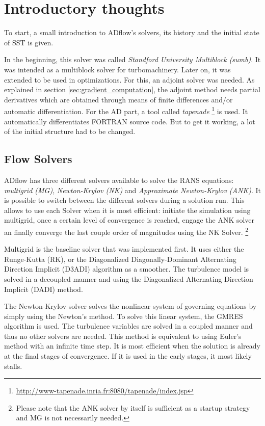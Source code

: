 \section{Introductory thoughts}
To start, a small introduction to ADflow's solvers, its history and the initial
state of SST is given.

In the beginning, this solver was called \textit{Standford University
Multiblock (sumb)}. It was intended as a multiblock solver for turbomachinery.
Later on, it was extended to be used in optimizations. For this, an adjoint
solver was needed. As explained in section \ref{sec:gradient_computation}, the
adjoint method needs partial derivatives which are obtained through means of
finite differences and/or automatic differentiation. For the AD part, a tool
called \textit{tapenade}
\footnote{\url{http://www-tapenade.inria.fr:8080/tapenade/index.jsp}} is used.
It automatically differentiates FORTRAN source code. But to get it working, a
lot of the initial structure had to be changed.




\subsection{Flow Solvers}
\label{sec:flow_solvers}
ADflow has three different solvers available to solve the RANS equations:
\textit{multigrid (MG)}, \textit{Newton-Krylov (NK)} and \textit{Approximate
Newton-Krylov (ANK)}. It is possible to switch between
the different solvers during a solution run. This allows to use each Solver
when it is most efficient: initiate the simulation using multigrid, once a
certain level of convergence is reached, engage the ANK solver an finally
converge the last couple order of magnitudes using the NK Solver.
\footnote{Please note that the ANK solver by itself is sufficient as a startup
strategy and MG is not necessarily needed.}

Multigrid is the baseline solver that was implemented first. It uses either the
Runge-Kutta (RK), or the Diagonalized Diagonally-Dominant Alternating Direction
Implicit (D3ADI) algorithm as a smoother. The turbulence model is solved in a
decoupled manner and using the Diagonalized Alternating Direction Implicit
(DADI) method.

The Newton-Krylov solver solves the nonlinear system of governing equations by
simply using the Newton's method. To solve this linear system, the GMRES
algorithm is used. The turbulence variables are solved in a coupled manner and
thus no other solvers are needed. This method is equivalent to using Euler's
method with an infinite time step. It is most efficient when the solution is
already at the final stages of convergence. If it is used in the early stages,
it most likely stalls.

